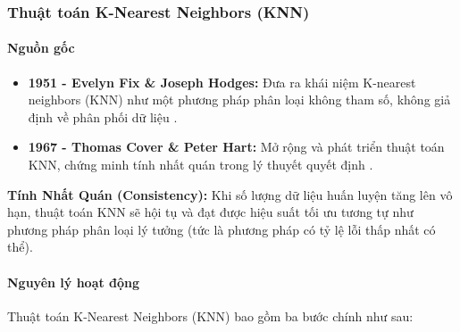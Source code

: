 \documentclass[a4paper,12pt]{article}
\begin{document}
\subsubsection{Thuật toán K-Nearest Neighbors (KNN)}

\paragraph{Nguồn gốc}
\begin{itemize}
    \item \textbf{1951 - Evelyn Fix \& Joseph Hodges:} Đưa ra khái niệm K-nearest neighbors (KNN) như một phương pháp phân loại không tham số, không giả định về phân phối dữ liệu \cite{fix_hodges_1951, fix1951}.
    \item \textbf{1967 - Thomas Cover \& Peter Hart:} Mở rộng và phát triển thuật toán KNN, chứng minh tính nhất quán trong lý thuyết quyết định \cite{cover1967}.
\end{itemize}
\textbf{Tính Nhất Quán (Consistency):} Khi số lượng dữ liệu huấn luyện tăng lên vô hạn, thuật toán KNN sẽ hội tụ và đạt được hiệu suất tối ưu tương tự như phương pháp phân loại lý tưởng (tức là phương pháp có tỷ lệ lỗi thấp nhất có thể).

\paragraph{Nguyên lý hoạt động}
\hspace{5mm}Thuật toán K-Nearest Neighbors (KNN) bao gồm ba bước chính \cite{knnprinciple} như sau:
\end{document}
